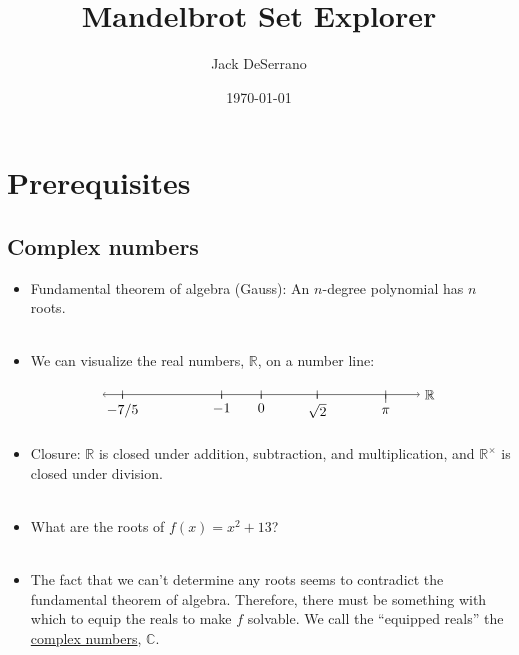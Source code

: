 \documentclass{beamer}
\title{Mandelbrot Set Explorer}
\author{Jack DeSerrano}
\date{\today}
\newcommand{\R}{\mathbb{R}}
\newcommand{\C}{\mathbb{C}}
\begin{document}
\frame{\titlepage}

\section[Outline]{}
\frame{\tableofcontents}

\section{Prerequisites}
\subsection{Complex numbers}
\frame
{
\begin{itemize}
\item <1-> Fundamental theorem of algebra (Gauss): An $n$-degree polynomial has $n$ roots.\\\text{}\\

\item <2->We can visualize the real numbers, $\R$, on a number line:

$$
\begin{tikzpicture}
\draw[<->] (-4, 0) -- (4, 0) node[right] 
{$\R$};
\foreach \n in  {
	-3.5,
	-1,
	0,
	1.4142135623730951, 
	3.141592653589793
	} 
\draw[shift = {(\n, 0)}, color = black] (0pt, 3pt) -- (0pt, -3pt);

\draw[shift = {(-3.5, 0)}, color = black] (0pt, 0pt) -- (0pt, -3pt) node [below] 
{$-7/5$};
\draw[shift = {(-1, 0)}, color = black] (0pt, 0pt) -- (0pt, -3pt) node [below] 
{$-1$};
\draw[shift = {(0, 0)}, color = black] (0pt, 0pt) -- (0pt, -3pt) node [below] 
{$0$};
\draw[shift = {(1.4142135623730951, 0)}, color = black] (0pt, 0pt) -- (0pt, -3pt) node [below] 
{$\sqrt 2$};
\draw[shift = {(3.141592653589793, 0)}, color = black] (0pt, 0pt) -- (0pt, -6pt) node [below] 
{$\pi$};

\end{tikzpicture}
$$

\item <3->Closure: $\R$ is closed under addition, subtraction, and multiplication, and $\R^\times$ is closed under division.\\\text{}\\

\item <4->What are the roots of $f(x) = x^2 +13$?\\\text{}\\

\item <5-> The fact that we can't determine any roots seems to contradict the fundamental theorem of algebra. Therefore, there must be something with which to equip the reals to make $f$ solvable. We call the ``equipped reals'' the \underline{complex numbers}, $\C$.
\end{itemize}
}
\end{document}
